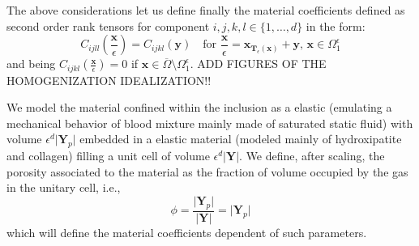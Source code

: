 The above considerations let us define finally the material coefficients defined as second order rank tensors for component $i,j,k,l \in \{1,\dots, d\}$ in the form:
\begin{equation*}
    C_{ijll}(\frac{\mathbf{x}}{\epsilon}) = C_{ijkl}(\mathbf{y}) \quad \text{for } \frac{\mathbf{x}}{\epsilon} = \mathbf{x}_{\mathbf{T}_{\epsilon}(\mathbf{x})} + \mathbf{y}, \, \mathbf{x} \in \Omega_1^{\epsilon}
\end{equation*}
and being $C_{ijkl}(\frac{\mathbf{x}}{\epsilon}) = 0$ if $\mathbf{x} \in \overline{\Omega} \setminus \Omega_1^{\epsilon}$.
ADD FIGURES OF THE HOMOGENIZATION IDEALIZATION!!

\begin{rem}
We model the material confined within the inclusion as a elastic (emulating a mechanical behavior of blood mixture mainly made of saturated static fluid) with volume $\epsilon^d \vert \mathbf{Y}_p \vert$ embedded in a elastic material (modeled mainly of hydroxipatite and collagen) filling a unit cell of volume $\epsilon^d \vert \mathbf{Y} \vert$.
We define, after scaling, the porosity associated to the material as the fraction of volume occupied by the gas in the unitary cell, i.e., 
\begin{equation*}
\phi = \frac{\vert \mathbf{Y}_p \vert}{\vert \mathbf{Y} \vert} = \vert \mathbf{Y}_p \vert
\end{equation*}
which will define the material coefficients dependent of such parameters.
\end{rem}



